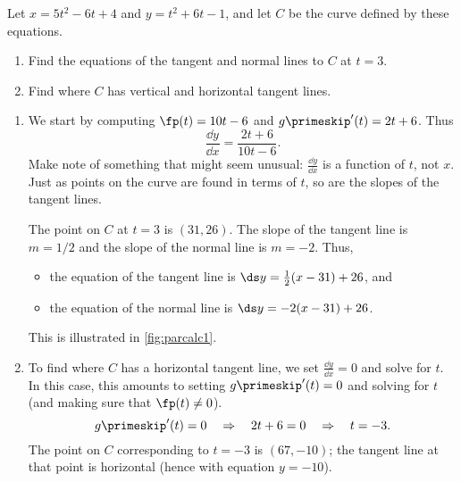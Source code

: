 \begin{example}\label{ex_parcalc1}
Let $x=5t^2-6t+4$ and $y=t^2+6t-1$, and let $C$ be the curve defined by these equations.
\begin{enumerate}
	\item	Find the equations of the tangent and normal lines to $C$ at $t=3$.
	\item	Find where $C$ has vertical and horizontal tangent lines.
\end{enumerate}
\solution
\begin{enumerate}
	\item We start by computing $\fp(t) = 10t-6$ and $g\primeskip'(t) =2t+6$. Thus \[\frac{\dd y}{\dd x} = \frac{2t+6}{10t-6}.\]
	Make note of something that might seem unusual: $\frac{\dd y}{\dd x}$ is a function of $t$, not $x$. Just as points on the curve are found in terms of $t$, so are the slopes of the tangent lines.

	The point on $C$ at $t=3$ is $(31,26)$. The slope of the tangent line is $m=1/2$ and the slope of the normal line is $m=-2$. Thus,
	\begin{itemize}
		\item the equation of the tangent line is $\ds y=\frac12(x-31)+26$, and
		\item	the equation of the normal line is $\ds y=-2(x-31)+26$.
	\end{itemize}
	This is illustrated in \autoref{fig:parcalc1}.


	\item	To find where $C$ has a horizontal tangent line, we set $\frac{\dd y}{\dd x}=0$ and solve for $t$. In this case, this amounts to setting $g\primeskip'(t)=0$ and solving for $t$ (and making sure that $\fp(t)\neq 0$). 
\[g\primeskip'(t)=0 \quad \Rightarrow \quad 2t+6=0 \quad \Rightarrow \quad t=-3.\]
	The point on $C$ corresponding to $t=-3$ is $(67,-10)$; the tangent line at that point is horizontal (hence with equation $y=-10$).
		

\end{enumerate}
\end{example}
